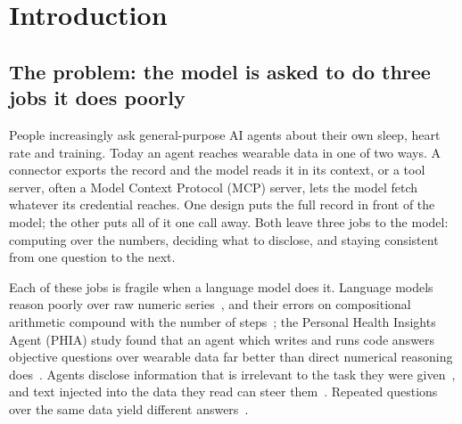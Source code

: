 \bigskip
\section{Introduction}\label{sec:intro}

\subsection{The problem: the model is asked to do three jobs it does poorly}

People increasingly ask general-purpose AI agents about their own sleep, heart rate and training. Today an agent
reaches wearable data in one of two ways. A connector exports the record and the model reads it in its context,
or a tool server, often a Model Context Protocol (MCP) server, lets the model fetch whatever its credential
reaches. One design puts the full record in front of the model; the other puts all of it one call away. Both leave
three jobs to the model: computing over the numbers, deciding what to disclose, and staying consistent from one
question to the next.

Each of these jobs is fragile when a language model does it. Language models reason poorly over raw numeric
series~\citep{merrill2024timeseries}, and their errors on compositional arithmetic compound with the number of
steps~\citep{dziri2023faith}; the Personal Health Insights Agent (PHIA) study found that an agent which writes and
runs code answers objective questions over wearable data far better than direct numerical reasoning
does~\citep{merrill2024phia}. Agents disclose information that is irrelevant to the task they were
given~\citep{shao2024privacylens,wang2025privacyinaction}, and text injected into the data they read can steer
them~\citep{greshake2023indirect}. Repeated questions over the same data yield different
answers~\citep{atil2024nondeterminism}.

